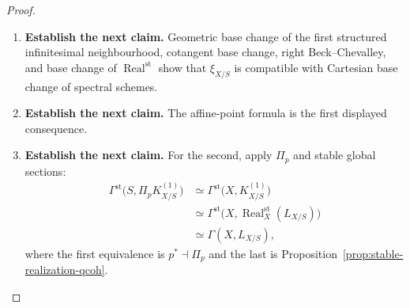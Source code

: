 \begin{proof}
\begin{enumerate}[label=\textup{(\arabic*)}]
    of spectra and produces the canonical equivalence
    \[
    \xi_{X/S}:
    K^{(1)}_{X/S}
    \xrightarrow{\simeq}
    \operatorname{Real}^{\mathrm{st}}_X(L_{X/S}).
    \]
    \item \textbf{Establish the next claim.}
    Geometric base change of the first structured infinitesimal neighbourhood, cotangent base change, right
    Beck--Chevalley, and base change of \(\operatorname{Real}^{\mathrm{st}}\) show that \(\xi_{X/S}\) is
    compatible with Cartesian base change of spectral schemes.
    \item \textbf{Establish the next claim.}
    The affine-point formula is the first displayed consequence.
    \item \textbf{Establish the next claim.}
    For the second,
    apply \(\Pi_p\) and stable global sections:
    \[
    \begin{aligned}
    \Gamma^{\mathrm{st}}
    \bigl(S,\Pi_pK^{(1)}_{X/S}\bigr)
    &\simeq
    \Gamma^{\mathrm{st}}
    \bigl(X,K^{(1)}_{X/S}\bigr)\\
    &\simeq
    \Gamma^{\mathrm{st}}
    \bigl(X,\operatorname{Real}^{\mathrm{st}}_X(L_{X/S})\bigr)\\
    &\simeq
    \Gamma(X,L_{X/S}),
    \end{aligned}
    \]
    where the first equivalence is \(p^*\dashv\Pi_p\) and the last is
    Proposition~\ref{prop:stable-realization-qcoh}.
\end{enumerate}
\end{proof}

